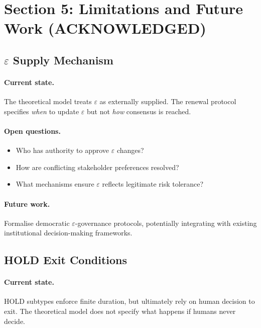 \section{Section 5: Limitations and Future Work
(ACKNOWLEDGED)}
\label{sec:invariants-limitations}

\subsection{$\varepsilon$ Supply Mechanism}

\paragraph{Current state.}
The theoretical model treats $\varepsilon$ as externally supplied.
The renewal protocol specifies \emph{when} to update $\varepsilon$
but not \emph{how} consensus is reached.

\paragraph{Open questions.}
\begin{itemize}
\item Who has authority to approve $\varepsilon$ changes?
\item How are conflicting stakeholder preferences resolved?
\item What mechanisms ensure $\varepsilon$ reflects legitimate risk
tolerance?
\end{itemize}

\paragraph{Future work.}
Formalise democratic $\varepsilon$-governance protocols, potentially
integrating with existing institutional decision-making frameworks.

\subsection{HOLD Exit Conditions}

\paragraph{Current state.}
HOLD subtypes enforce finite duration, but ultimately rely on human
decision to exit. The theoretical model does not specify what
happens if humans never decide.


